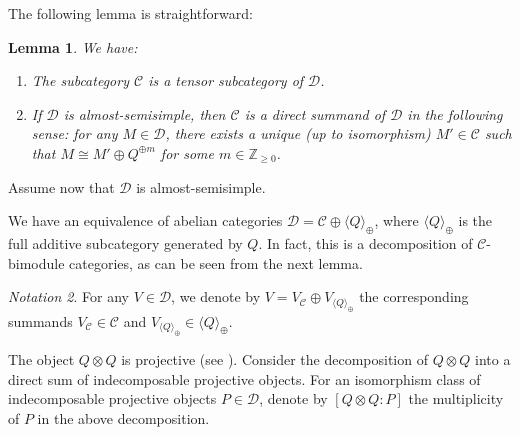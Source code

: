 \documentclass{amsart}
\theoremstyle{plain}%
\newtheorem{lemma}{Lemma}[subsection]
\theoremstyle{remark}
\newtheorem{notation}[lemma]{Notation}
\newcommand{\C}{\mathcal{C}}
\newcommand{\1}{\mathbbm{1}}
\newcommand{\D}{\mathcal{D}}
\newcommand{\Z}{\mathbb{Z}}
\newcommand{\Hom}{\mathrm{Hom}}
\newcommand{\comment}[1]{}
\begin{document}
The following lemma is straightforward:
    \begin{lemma}\label{lem:blocks_almost_semsimple}
        We have:
        \begin{enumerate}
            \item The subcategory $\C$ is a tensor subcategory of $\D$.
            \item If $\D$ is almost-semisimple, then $\C$ is a direct summand of $\D$ in the following sense: for any $M\in \D$, there exists a unique (up to isomorphism) $M'\in \C$ such that $M\cong M'\oplus Q^{\oplus m}$ for some $m\in \Z_{\geq 0}$. 
        \end{enumerate}
    \end{lemma}
       Assume now that $\D$ is almost-semisimple. 
       
       We have an equivalence of abelian categories $\D=\C\oplus \langle Q\rangle_{\oplus}$, where $\langle Q\rangle_{\oplus}$ is the full additive subcategory generated by $Q$. In fact, this is a decomposition of $\C$-bimodule categories, as can be seen from the next lemma.
       \begin{notation}\label{notn:decomp}
           For any $V\in \D$, we denote by $V = V_\C\oplus V_{\langle Q\rangle_{\oplus}}$ the corresponding summands $V_\C\in \C$ and $V_{\langle Q\rangle_{\oplus}}\in {\langle Q\rangle_{\oplus}}$.
       \end{notation}


    \comment{
    \begin{proof}
        \mbox{}
        \begin{enumerate}
            \item The tensor product of any two invertible objects in $\D$ is invertible. The objects in $\C$ are precisely those whose Jordan--H\"older composition factors are all invertible. Since the bifunctor $-\otimes-$ is biexact, it follows that the tensor product of any two objects in $\C$ has only invertible Jordan--H\"older composition factors, so it lies again in $\C$. This proves that $\C$ is a tensor subcategory of $\D$. 
            \item Let $M\in \D$, and set $m:=\dim \Hom_{\D}(Q, M)$. 
            
            Since $Q$ is injective and projective, there exists a unique (up to isomorphism) $M'\in \D$ such that $M\cong M'\oplus Q^{\oplus m}$ and $\dim \Hom_{\D}(Q, M')=0$. It remains to show that $M'\in \C$; that is, we need to show that the Jordan--H\"older composition factors of $M'$ are all invertible. Since $Q$ is injective and projective, it may appear as a composition factor in $M'$ if and only if it appears as a direct summand. Yet $\dim \Hom_{\D}(Q, M')=0$, implying that $Q$ does not appear as a composition factor in $M'$. This proves the statement.
        \end{enumerate}
    \end{proof}
}
The object $Q\otimes Q$ is projective (see \cite[Proposition 4.2.12]{EGNO}). Consider the decomposition of $Q\otimes Q$ into a direct sum of indecomposable projective objects.  
    For an isomorphism class of indecomposable projective objects $P\in \D$, denote by $[Q\otimes Q:P] $ the multiplicity of $P$ in the above decomposition.
\end{document}
